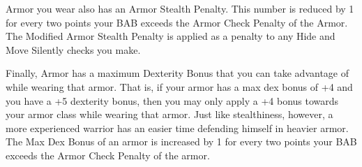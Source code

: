 Armor you wear also has an Armor Stealth Penalty. This number is reduced by 1 for every two points your BAB exceeds the Armor Check Penalty of the Armor. The Modified Armor Stealth Penalty is applied as a penalty to any Hide and Move Silently checks you make.

Finally, Armor has a maximum Dexterity Bonus that you can take advantage of while wearing that armor. That is, if your armor has a max dex bonus of +4 and you have a +5 dexterity bonus, then you may only apply a +4 bonus towards your armor class while wearing that armor. Just like stealthiness, however, a more experienced warrior has an easier time defending himself in heavier armor. The Max Dex Bonus of an armor is increased by 1 for every two points your BAB exceeds the Armor Check Penalty of the armor.


\columnsections
